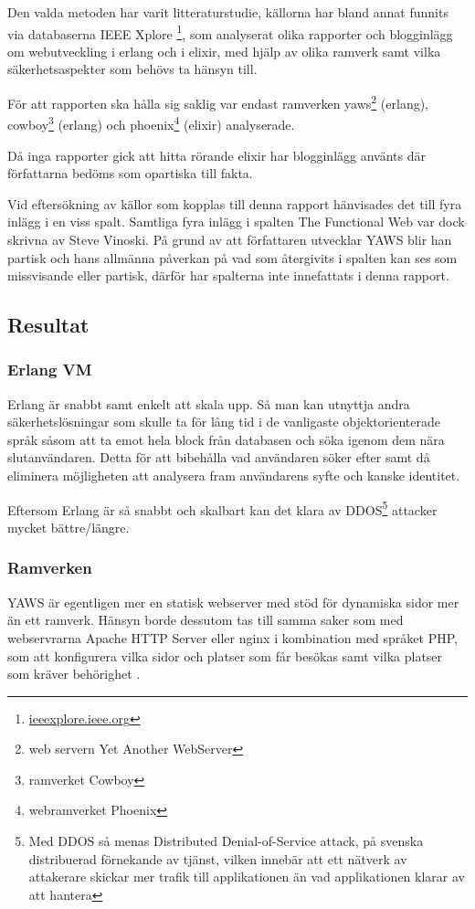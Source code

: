 \documentclass[12pt]{article}
\begin{document}
Den valda metoden har varit litteraturstudie, källorna har bland annat funnits via databaserna IEEE Xplore  \footnote{ \url{ieeexplore.ieee.org}},  som analyserat olika rapporter och blogginlägg om webutveckling i erlang och i elixir, med hjälp av olika ramverk samt vilka säkerhetsaspekter som behövs ta hänsyn till.

För att rapporten ska hålla sig saklig var endast ramverken yaws\footnote{web servern Yet Another WebServer\cite{yawsorg}} (erlang), cowboy\footnote{ramverket Cowboy\cite{cowboyorg}} (erlang) och phoenix\footnote{webramverket Phoenix\cite{phoenixorg}} (elixir) analyserade.

Då inga rapporter gick att hitta rörande elixir har blogginlägg använts där författarna bedöms som opartiska till fakta.

Vid eftersökning av källor som kopplas till denna rapport hänvisades det till fyra inlägg i en viss spalt.
Samtliga fyra inlägg i spalten The Functional Web var dock skrivna av Steve Vinoski. På grund av att författaren utvecklar YAWS blir han partisk och hans allmänna påverkan på vad som återgivits i spalten kan ses som missvisande eller partisk, därför har spalterna inte innefattats i denna rapport.

\subsection{ Resultat}

\subsubsection*{Erlang VM}
	Erlang är snabbt samt enkelt att skala upp. Så man kan utnyttja andra säkerhetslösningar som skulle ta för lång tid i de vanligaste objektorienterade språk såsom att ta emot hela block från databasen och söka igenom dem nära slutanvändaren. Detta för att bibehålla vad användaren söker efter samt då eliminera möjligheten att analysera fram användarens syfte och kanske identitet\cite{database}.

Eftersom Erlang är så snabbt och skalbart kan det klara av DDOS\footnote{Med DDOS så menas Distributed Denial-of-Service attack, på svenska distribuerad förnekande av tjänst, vilken innebär att ett nätverk av attakerare skickar mer trafik till applikationen än vad applikationen klarar av att hantera} attacker mycket bättre/längre\cite{resource-safe}.

\subsubsection*{Ramverken}
YAWS är egentligen mer en statisk webserver med stöd för dynamiska sidor mer än ett ramverk. Hänsyn borde dessutom tas till samma saker som med webservrarna Apache HTTP Server eller nginx i kombination med språket PHP, som att konfigurera vilka sidor och platser som får besökas samt vilka platser som kräver behörighet \cite{yaws}.
\end{document}
